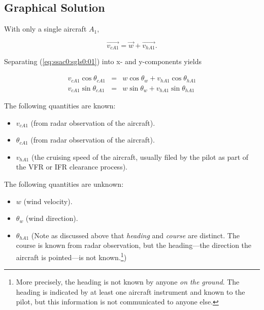 \documentclass[letterpaper,10pt,titlepage]{article}
\begin{document}

\subsection{Graphical Solution}
\label{ssac0:sgsl0}

With only a single aircraft $A_1$,

\begin{equation}
\label{eq:ssac0:sgls0:01}
\vec{v_{cA1}} = \vec{w} + \vec{v_{hA1}} .
\end{equation}

\noindent{}Separating (\ref{eq:ssac0:sgls0:01}) into x- and y-components yields

\begin{eqnarray}
\label{eq:ssac0:sgls0:02}
v_{cA1} \cos \theta_{cA1} & = & w \cos \theta_w + v_{hA1} \cos \theta_{hA1} \\
\label{eq:ssac0:sgls0:03}
v_{cA1} \sin \theta_{cA1} & = & w \sin \theta_w + v_{hA1} \sin \theta_{hA1}
\end{eqnarray}

\noindent{}The following quantities are known:

\begin{itemize}
\item $v_{cA1}$ (from radar observation of the aircraft).
\item $\theta_{cA1}$ (from radar observation of the aircraft).
\item $v_{hA1}$ (the cruising speed of the aircraft, usually 
                filed by the pilot as part of the VFR or IFR clearance process).
\end{itemize}

\noindent{}The following quantities are unknown:

\begin{itemize}
\item $w$ (wind velocity).
\item $\theta_{w}$ (wind direction).
\item $\theta_{hA1}$ (Note as discussed above that \emph{heading} and 
      \emph{course} are distinct.  The course is known from radar observation,
      but the heading---the direction the aircraft is pointed---is not 
      known.\footnote{More precisely, the heading is not known by anyone \emph{on
      the ground}.  The heading is indicated by at least one aircraft instrument
      and known to the pilot, but this information is not communicated to anyone
      else.})
\end{itemize}
\end{document}
